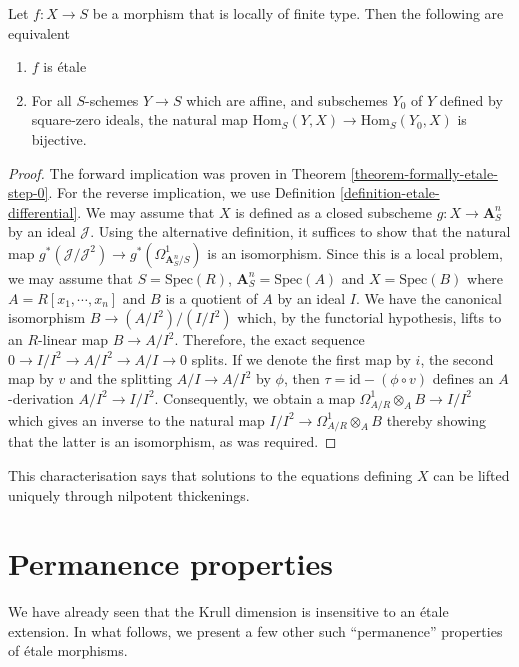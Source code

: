 \begin{theorem}
\label{theorem-formally-etale}
Let $f : X \to S$ be a morphism that is locally of finite type. Then the
following are equivalent
\begin{enumerate}
\item $f$ is \'etale
\item For all $S$-schemes $Y \to S$ which are affine, and subschemes $Y_0$
of $Y$ defined by square-zero ideals, the natural map
$\text{Hom}_S(Y, X) \to \text{Hom}_S(Y_0, X)$ is bijective.
\end{enumerate}
\end{theorem}

\begin{proof}
The forward implication was proven in Theorem
\ref{theorem-formally-etale-step-0}. For the reverse implication, we use
Definition \ref{definition-etale-differential}. We may assume that $X$ is
defined as a closed subscheme $g: X \to \mathbf{A}^n_S$ by an ideal
$\mathcal{J}$. Using the
alternative definition, it suffices to show that the natural map
$g^*(\mathcal{J}/\mathcal{J}^2) \to g^*(\Omega^1_{\mathbf{A}^n_S/S})$ is an
isomorphism. Since this is
a local problem, we may assume that $S = \text{Spec}(R)$,
$\mathbf{A}^n_S = \text{Spec}(A)$ and $X = \text{Spec}(B)$ where
$A = R[x_1, \cdots, x_n]$ and $B$ is a quotient of $A$ by
an ideal $I$. We have the canonical isomorphism $B \to (A/I^2)/(I/I^2)$
which, by the functorial hypothesis, lifts to an $R$-linear map
$B \to A/I^2$. Therefore, the exact sequence
$0 \to I/I^2 \to A/I^2 \to A/I \to 0$ splits. If we denote the first map
by $i$, the second map by $v$ and the splitting $A/I \to A/I^2$ by $\phi$,
then $\tau = \mathrm{id} - (\phi \circ v)$ defines an $A$-derivation
$A/I^2 \to I/I^2$. Consequently, we obtain a map
$\Omega^1_{A/R} \otimes_A B \to I/I^2$ which gives an inverse to the
natural map $I/I^2 \to \Omega^1_{A/R} \otimes_A B$ thereby showing that
the latter is an isomorphism, as was required.
\end{proof}

\noindent
This characterisation says that solutions to the equations defining $X$ can
be lifted uniquely through nilpotent thickenings.

\section{Permanence properties}
\label{section-properties-permanence}

\noindent
We have already seen that the Krull dimension is insensitive to an \'etale
extension. In what follows, we present a few other such ``permanence''
properties of \'etale morphisms.

